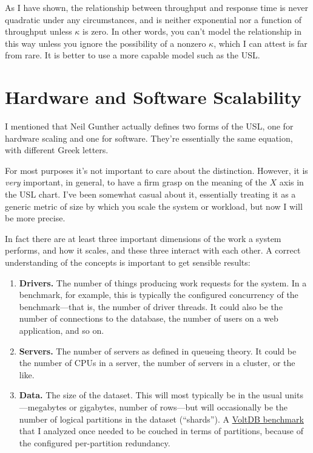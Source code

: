 \documentclass{vivid_layout}
\begin{document}
As I have shown, the relationship between throughput and response
time is never quadratic under any circumstances, and is neither exponential 
nor a function of throughput unless $\kappa$ is zero.
In other words, you can't model the relationship in this way unless you
ignore the possibility of a nonzero $\kappa$, which I can attest is far from
rare. It is better to use a more capable model such as the USL.

\section{Hardware and Software Scalability}

I mentioned that Neil Gunther actually defines two forms of the USL, one for
hardware scaling and one for software. They're essentially the same equation,
with different Greek letters.

For most purposes it's not important to care about the distinction. However, it
is {\itshape very} important, in general, to have a firm grasp on the meaning of
the $X$ axis in the USL chart. I've been somewhat casual about it, essentially
treating it as a generic metric of size by which you scale the system or
workload, but now I will be more precise.

In fact there are at least three important dimensions of the work a system
performs, and how it scales, and these three interact with each other. A correct
understanding of the concepts is important to get sensible results:

\begin{enumerate}
\item {\bfseries Drivers.} The number of things producing work requests for the
system. In a benchmark, for example, this is typically the configured
concurrency of the benchmark---that is, the number of driver threads. It could
also be the number of connections to the database, the number of users on a web
application, and so on.
\item {\bfseries Servers.} The number of servers as defined in queueing theory. It could be the
number of CPUs in a server, the number of servers in a cluster, or the like.
\item {\bfseries Data.} The size of the dataset. This will most typically be in the usual
units---megabytes or gigabytes, number of rows---but will occasionally be the
number of logical partitions in the dataset (``shards''). A
\href{https://www.percona.com/blog/2011/02/28/is-voltdb-really-as-scalable-as-they-claim/}{VoltDB
benchmark} that I analyzed once needed to be couched in terms of partitions,
because of the configured per-partition redundancy.
\end{enumerate}
\end{document}
